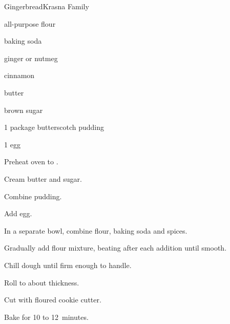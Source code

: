 \begin{recipe}{Gingerbread}{Krasna Family}{}

\begin{ingredients}
\item \C{1 \half} all-purpose flour
\item {} baking soda
\item {} ginger or nutmeg
\item \tp{1 \half} cinnamon
\item \C{\half} butter
\item \C{\half} brown sugar
\item 1 package butterscotch pudding
\item 1 egg
\end{ingredients}

\begin{directions}
\item Preheat oven to .
\item Cream butter and sugar.
\item Combine pudding.
\item Add egg.
\item In a separate bowl, combine flour, baking soda and spices.
\item Gradually add flour mixture, beating after each addition until smooth.
\item Chill dough until firm enough to handle.
\item Roll to about  thickness.
\item Cut with floured cookie cutter.
\item Bake for 10 to 12~minutes.
\end{directions}
\end{recipe}
